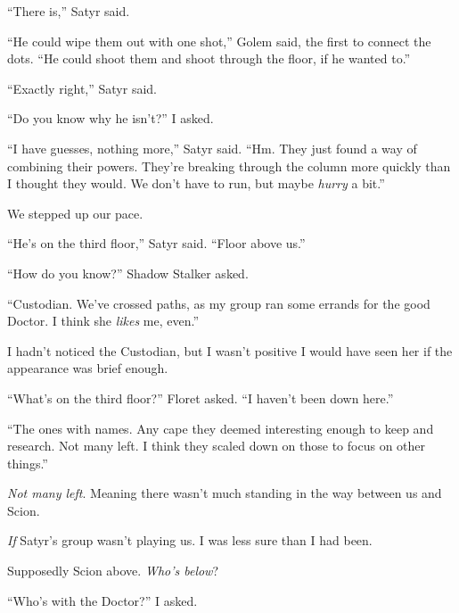 ``There is,'' Satyr said.



``He could wipe them out with one shot,'' Golem said, the first to connect the dots.  ``He could shoot them and shoot through the floor, if he wanted to.''



``Exactly right,'' Satyr said.



``Do you know why he isn't?'' I asked.



``I have guesses, nothing more,'' Satyr said.  ``Hm.  They just found a way of combining their powers.  They're breaking through the column more quickly than I thought they would.  We don't have to run, but maybe \emph{hurry} a bit.''



We stepped up our pace.



``He's on the third floor,'' Satyr said.  ``Floor above us.''



``How do you know?'' Shadow Stalker asked.



``Custodian.  We've crossed paths, as my group ran some errands for the good Doctor.  I think she \emph{likes} me, even.''



I hadn't noticed the Custodian, but I wasn't positive I would have seen her if the appearance was brief enough.



``What's on the third floor?'' Floret asked.  ``I haven't been down here.''



``The ones with names.  Any cape they deemed interesting enough to keep and research.  Not many left.  I think they scaled down on those to focus on other things.''



\emph{Not many left}.  Meaning there wasn't much standing in the way between us and Scion.



\emph{If} Satyr's group wasn't playing us.  I was less sure than I had been.



Supposedly Scion above.  \emph{Who's below}?



``Who's with the Doctor?'' I asked.



